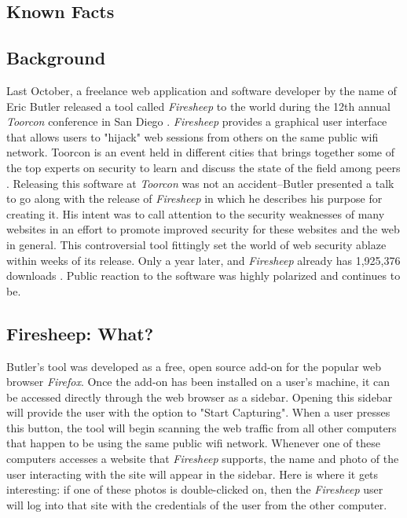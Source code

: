 \documentclass[11pt]{article}
\begin{document}
\begin{multicols}{2}
\setcounter{page}{1}

\section{Known Facts}
\subsection{Background}
Last October, a freelance web application and software developer by the name of Eric Butler released a tool called \emph{Firesheep} to the world during the 12th annual \emph{Toorcon} conference in San Diego \cite{codebutler_main}. \emph{Firesheep} provides a graphical user interface that allows users to "hijack" web sessions from others on the same public wifi network. Toorcon is an event held in different cities that brings together some of the top experts on security to learn and discuss the state of the field among peers \cite{toorcon}. Releasing this software at \emph{Toorcon} was not an accident--Butler presented a talk to go along with the release of \emph{Firesheep} in which he describes his purpose for creating it. His intent was to call attention to the security weaknesses of many websites in an effort to promote improved security for these websites and the web in general. This controversial tool fittingly set the world of web security ablaze within weeks of its release. Only a year later, and \emph{Firesheep} already has 1,925,376 downloads \cite{github}. Public reaction to the software was highly polarized and continues to be.

\subsection{Firesheep: What?}
Butler's tool was developed as a free, open source add-on for the popular web browser \emph{Firefox}. Once the add-on has been installed on a user's machine, it can be accessed directly through the web browser as a sidebar. Opening this sidebar will provide the user with the option to "Start Capturing". When a user presses this button, the tool will begin scanning the web traffic from all other computers that happen to be using the same public wifi network. Whenever one of these computers accesses a website that \emph{Firesheep} supports, the name and photo of the user interacting with the site will appear in the sidebar. Here is where it gets interesting: if one of these photos is double-clicked on, then the \emph{Firesheep} user will log into that site with the credentials of the user from the other computer. \cite{codebutler_main}


\end{multicols}
\end{document}
